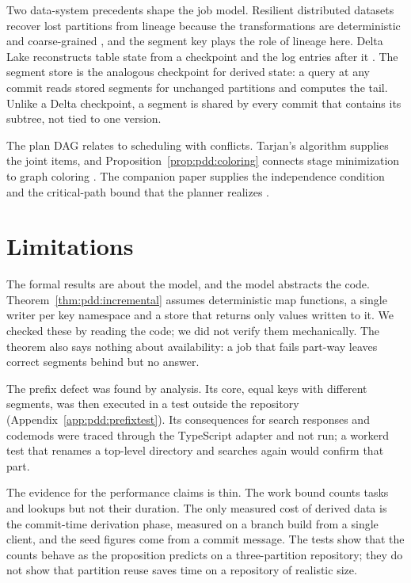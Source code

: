 \documentclass[11pt,letterpaper]{article}
\theoremstyle{definition}
\theoremstyle{remark}
\begin{document}
Two data-system precedents shape the job model. Resilient distributed datasets recover lost partitions from lineage because the transformations are deterministic and coarse-grained \cite{zaharia2012rdd}, and the segment key plays the role of lineage here. Delta Lake reconstructs table state from a checkpoint and the log entries after it \cite{armbrust2020delta,deltaprotocol}. The segment store is the analogous checkpoint for derived state: a query at any commit reads stored segments for unchanged partitions and computes the tail. Unlike a Delta checkpoint, a segment is shared by every commit that contains its subtree, not tied to one version.

The plan DAG relates to scheduling with conflicts. Tarjan's algorithm \cite{tarjan1972} supplies the joint items, and Proposition~\ref{prop:pdd:coloring} connects stage minimization to graph coloring \cite{karp1972}. The companion paper supplies the independence condition and the critical-path bound that the planner realizes \cite{long2026inversion}.

\section{Limitations}
\label{sec:pdd:limits}

The formal results are about the model, and the model abstracts the code. Theorem~\ref{thm:pdd:incremental} assumes deterministic map functions, a single writer per key namespace and a store that returns only values written to it. We checked these by reading the code; we did not verify them mechanically. The theorem also says nothing about availability: a job that fails part-way leaves correct segments behind but no answer.

The prefix defect was found by analysis. Its core, equal keys with different segments, was then executed in a test outside the repository (Appendix~\ref{app:pdd:prefixtest}). Its consequences for search responses and codemods were traced through the TypeScript adapter and not run; a workerd test that renames a top-level directory and searches again would confirm that part.

The evidence for the performance claims is thin. The work bound counts tasks and lookups but not their duration. The only measured cost of derived data is the commit-time derivation phase, measured on a branch build from a single client, and the seed figures come from a commit message. The tests show that the counts behave as the proposition predicts on a three-partition repository; they do not show that partition reuse saves time on a repository of realistic size.
\end{document}
